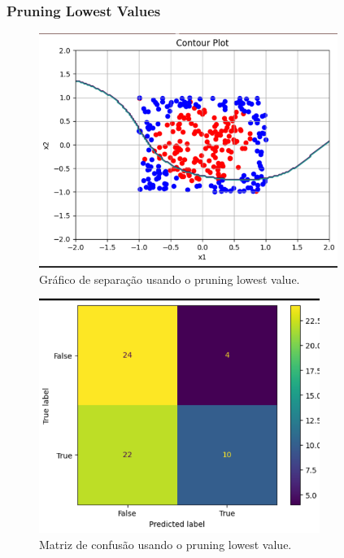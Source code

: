 \documentclass{article}
\begin{document}
\newpage

\subsubsection*{Pruning Lowest Values}

\vspace{25pt}

\begin{figure}[h]

    \centering
    \includegraphics[height=3in]{sep_plv_circle.png}
    \caption{Gráfico de separação usando o pruning lowest value.}
    \label{fig:example}
    
\end{figure}

\vspace{25pt}

\begin{figure}[h]

    \centering
    \includegraphics[height=3in]{conf_mat_plv.png}
    \caption{Matriz de confusão usando o pruning lowest value.}
    \label{fig:example}
    
\end{figure}
\end{document}

